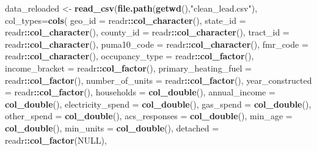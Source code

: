 \documentclass[]{article}
\newenvironment{Shaded}{\begin{snugshade}}{\end{snugshade}}
\newcommand{\DataTypeTok}[1]{\textcolor[rgb]{0.13,0.29,0.53}{#1}}
\newcommand{\KeywordTok}[1]{\textcolor[rgb]{0.13,0.29,0.53}{\textbf{#1}}}
\newcommand{\NormalTok}[1]{#1}
\newcommand{\OperatorTok}[1]{\textcolor[rgb]{0.81,0.36,0.00}{\textbf{#1}}}
\newcommand{\OtherTok}[1]{\textcolor[rgb]{0.56,0.35,0.01}{#1}}
\newcommand{\StringTok}[1]{\textcolor[rgb]{0.31,0.60,0.02}{#1}}
\begin{document}
\begin{Shaded}
\begin{Highlighting}[]
\NormalTok{data_reloaded <-}\StringTok{ }\KeywordTok{read_csv}\NormalTok{(}\KeywordTok{file.path}\NormalTok{(}\KeywordTok{getwd}\NormalTok{(),}\StringTok{"clean_lead.csv"}\NormalTok{),}
                          \DataTypeTok{col_types=}\KeywordTok{cols}\NormalTok{(}
                            \DataTypeTok{geo_id =}\NormalTok{ readr}\OperatorTok{::}\KeywordTok{col_character}\NormalTok{(),}
                            \DataTypeTok{state_id =}\NormalTok{ readr}\OperatorTok{::}\KeywordTok{col_character}\NormalTok{(),}
                            \DataTypeTok{county_id =}\NormalTok{ readr}\OperatorTok{::}\KeywordTok{col_character}\NormalTok{(),}
                            \DataTypeTok{tract_id =}\NormalTok{ readr}\OperatorTok{::}\KeywordTok{col_character}\NormalTok{(),}
                            \DataTypeTok{puma10_code =}\NormalTok{ readr}\OperatorTok{::}\KeywordTok{col_character}\NormalTok{(),}
                            \DataTypeTok{fmr_code =}\NormalTok{ readr}\OperatorTok{::}\KeywordTok{col_character}\NormalTok{(),}
                            \DataTypeTok{occupancy_type =}\NormalTok{ readr}\OperatorTok{::}\KeywordTok{col_factor}\NormalTok{(),}
                            \DataTypeTok{income_bracket =}\NormalTok{ readr}\OperatorTok{::}\KeywordTok{col_factor}\NormalTok{(),}
                            \DataTypeTok{primary_heating_fuel =}\NormalTok{ readr}\OperatorTok{::}\KeywordTok{col_factor}\NormalTok{(),}
                            \DataTypeTok{number_of_units =}\NormalTok{ readr}\OperatorTok{::}\KeywordTok{col_factor}\NormalTok{(),}
                            \DataTypeTok{year_constructed =}\NormalTok{ readr}\OperatorTok{::}\KeywordTok{col_factor}\NormalTok{(),}
                            \DataTypeTok{households =} \KeywordTok{col_double}\NormalTok{(),}
                            \DataTypeTok{annual_income =} \KeywordTok{col_double}\NormalTok{(),}
                            \DataTypeTok{electricity_spend =} \KeywordTok{col_double}\NormalTok{(),}
                            \DataTypeTok{gas_spend =} \KeywordTok{col_double}\NormalTok{(),}
                            \DataTypeTok{other_spend =} \KeywordTok{col_double}\NormalTok{(),}
                            \DataTypeTok{acs_responses =} \KeywordTok{col_double}\NormalTok{(),}
                            \DataTypeTok{min_age =} \KeywordTok{col_double}\NormalTok{(),}
                            \DataTypeTok{min_units =} \KeywordTok{col_double}\NormalTok{(),}
                            \DataTypeTok{detached =}\NormalTok{ readr}\OperatorTok{::}\KeywordTok{col_factor}\NormalTok{(}\OtherTok{NULL}\NormalTok{),}

\end{Highlighting}
\end{Shaded}
\end{document}
